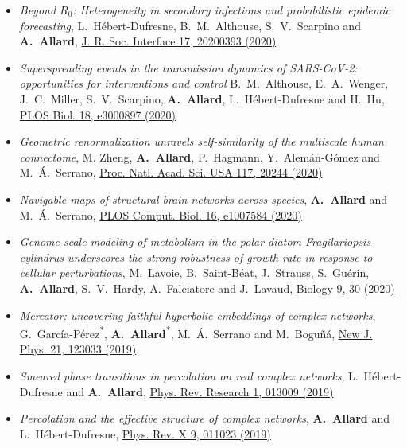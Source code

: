 \documentclass[11pt]{article}
\begin{document}
\begin{itemize}[itemsep=0.5em]
  \item \textit{Beyond $R_0$: Heterogeneity in secondary infections and probabilistic epidemic forecasting}, L.~H\'ebert-Dufresne, B.~M.~Althouse, S.~V.~Scarpino and \textbf{A.~Allard}, \href{https://doi.org/10.1098/rsif.2020.0393}{J. R. Soc. Interface 17, 20200393 (2020)}
%
  \item \textit{Superspreading events in the transmission dynamics of SARS-CoV-2: opportunities for interventions and control} B.~M.~Althouse, E.~A.~Wenger, J.~C.~Miller, S.~V.~Scarpino, \textbf{A.~Allard}, L.~H\'ebert-Dufresne and H.~Hu, \href{https://doi.org/10.1371/journal.pbio.3000897}{PLOS Biol. 18, e3000897 (2020)}
%
  \item \textit{Geometric renormalization unravels self-similarity of the multiscale human connectome}, M. Zheng, \textbf{A.~Allard}, P.~Hagmann, Y.~Alem\'an-G\'omez and M.~\'A.~Serrano, \href{http://doi.org/10.1073/pnas.1922248117}{Proc. Natl. Acad. Sci. USA 117, 20244 (2020)}
%
  \item \textit{Navigable maps of structural brain networks across species}, \textbf{A.~Allard} and M.~\'A.~Serrano, \href{https://doi.org/10.1371/journal.pcbi.1007584}{PLOS Comput. Biol. 16, e1007584 (2020)}
  \item \textit{Genome-scale modeling of metabolism in the polar diatom Fragilariopsis cylindrus underscores the strong robustness of growth rate in response to cellular perturbations}, M.~Lavoie, B.~Saint-Béat, J.~Strauss, S.~Guérin, \textbf{A.~Allard}, S.~V.~Hardy, A.~Falciatore and J.~Lavaud, \href{https://doi.org/10.3390/biology9020030}{Biology 9, 30 (2020)}
%
  \item \textit{Mercator: uncovering faithful hyperbolic embeddings of complex networks}, G.~Garc\'ia-P\'erez\textsuperscript{*}, \textbf{A.~Allard}\textsuperscript{*}, M.~\'A.~Serrano and M.~Bogu\~n\'a, \href{https://doi.org/10.1088/1367-2630/ab57d2}{New J. Phys. 21, 123033 (2019)}
%
  \item \textit{Smeared phase transitions in percolation on real complex networks}, L.~H\'ebert-Dufresne and \textbf{A.~Allard}, \href{http://doi.org/10.1103/PhysRevResearch.1.013009}{Phys. Rev. Research 1, 013009 (2019)}
%
  \item \textit{Percolation and the effective structure of complex networks}, \textbf{A.~Allard} and L.~H\'ebert-Dufresne, \href{http://doi.org/10.1103/PhysRevX.9.011023}{Phys. Rev. X 9, 011023 (2019)}

\end{itemize}
\end{document}
